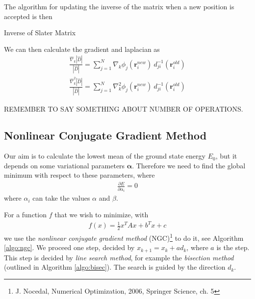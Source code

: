 \documentclass[twocolumns, a4paper,11pt,fleqn]{extarticle}
\newcommand{\eq}[1]{{\small\begin{align*}#1\end{align*}}}
\renewcommand\vec[1]{\boldsymbol{\mathbf{#1}}}
\newcommand{\op}[1]{\hat{#1}}
\begin{document}
The algorithm for updating the inverse of the matrix 
when a new position is accepted is then

\begin{algorithm}
	\caption{Inverse of Slater Matrix}\label{algo1}
  \begin{algorithmic}[1]
      \State{$ S_j = \sum_{l=1}^N d_{il}(\vec r^{new}) d_{lj}^{-1}(\vec r^{old}) $}
    \EndFor
    \EndProcedure
    \EndProcedure
  \end{algorithmic}
\end{algorithm}

We can then calculate the gradient and laplacian as
\eq{
  \frac{\op\nabla_k |\op D|}{|\op D|} 
    = \sum_{j=1}^N \nabla_k \phi_j(\vec r_i^{new})\ d_{ji}^{-1} (\vec r_i^{old})\\
  \frac{\op\nabla_k^2 |\op D|}{|\op D|} 
    = \sum_{j=1}^N \nabla_k^2 \phi_j(\vec r_i^{new})\ d_{ji}^{-1} (\vec r_i^{old})
}

REMEMBER TO SAY SOMETHING ABOUT NUMBER OF OPERATIONS.

\subsection{Nonlinear Conjugate Gradient Method}
Our aim is to calculate the lowest mean of the ground state energy $E_0$,
but it depends on some variational parameters $\vec \alpha$.
Therefore we need to find the global minimum with respect to these parameters,
where
\eq{
  \frac{\partial E}{\partial \alpha_i} = 0
}
where $\alpha_i$ can take the values $\alpha$ and $\beta$.

For a function $f$ that we wish to minimize, with
\eq{
  f(x) = \frac{1}{2}x^T Ax + b^Tx + c
}
we use the \textit{nonlinear conjugate gradient method} 
(NGC)\footnote{J. Nocedal, Numerical Optimization, 2006, Springer Science, ch. 5}
to do it, see Algorithm \ref{algo:ngc}.
We proceed one step, decided by $x_{k+1}=x_k + ad_k$, where $a$
is the step. This step is decided by \textit{line search method},
for example the \textit{bisection method} (outlined in Algorithm \ref{algo:bisec}).
The search is guided by the direction $d_k$.
\end{document}
